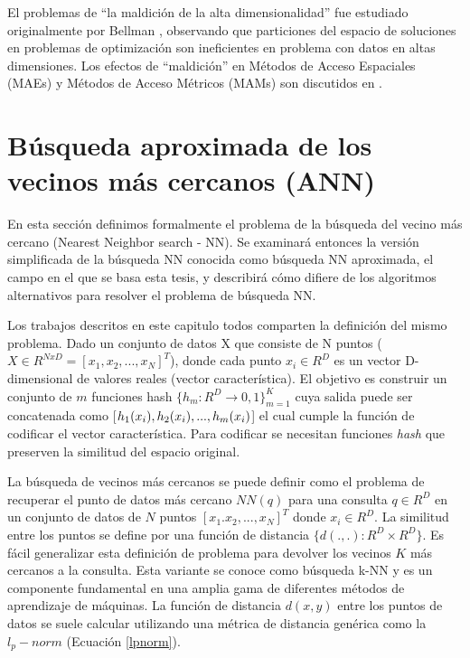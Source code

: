 El problemas de ``la maldición de la alta dimensionalidad'' fue estudiado originalmente por Bellman \cite{citeulike:Bellman}, observando que particiones del espacio de soluciones en problemas de optimización son ineficientes en problema con datos en altas dimensiones. Los efectos de ``maldición'' en Métodos de Acceso Espaciales (MAEs) y Métodos de Acceso Métricos (MAMs) son discutidos en  \cite{aleman_high_dimensional, WhatsWrong, DBLP:journals/corr/abs-0906-0391}.

\section{Búsqueda aproximada  de los vecinos más cercanos (ANN)}

En esta sección   definimos formalmente el problema de la búsqueda del vecino más cercano (Nearest Neighbor search - NN). Se examinará entonces la versión simplificada de la búsqueda NN conocida como búsqueda NN aproximada, el campo en el que se basa esta tesis, y describirá cómo difiere de los algoritmos alternativos para resolver el problema de búsqueda NN.

Los trabajos descritos en este capitulo todos comparten la definición del mismo problema. Dado un conjunto de datos X que consiste de N puntos ($X \in R ^ {NxD} = [x_1, x_2,..., x_N]^T$), donde cada punto $x_i \in R^D$ es un vector D-dimensional de valores reales (vector característica). El objetivo es construir un conjunto de $m$ funciones hash $\{ h_m : R^D \rightarrow {0, 1}\}_{m=1}^K$ cuya salida puede ser concatenada como [$h_1(x_i), h_2(x_i), ..., h_m(x_i)$]  el cual cumple la función de codificar el vector característica.  Para codificar se necesitan funciones \textit{hash} que preserven la similitud del espacio original.  
 
La búsqueda de vecinos más cercanos se puede definir como el problema de recuperar el punto de datos más cercano $ NN(q) $ para una consulta $ q \in R^D$ en un conjunto de datos de $N$ puntos  $ [x_1. x_2 , ..., x_N]^T $ donde $x_i \in R^D$. La similitud entre los puntos   se define por una función de distancia  $\{ d(.,.) : R^D \times R^D  \}$.   Es fácil generalizar esta definición de problema para devolver los vecinos $K$ más cercanos a la consulta. Esta variante se conoce   como búsqueda k-NN y es un componente fundamental en una amplia gama de diferentes métodos de aprendizaje de máquinas. La función de distancia $d(x,y)$ entre los puntos de datos se suele calcular utilizando una métrica de distancia genérica como la $l_p - norm$ (Ecuación \ref{lpnorm}).

